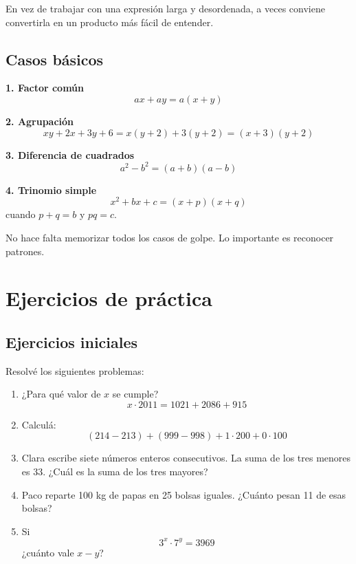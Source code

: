 \documentclass[12pt]{article}
\newcommand{\observa}[1]{%
    \begin{tcolorbox}[colback=amarilloSuave, colframe=naranjaEureka, title=Observa y piensa]
    #1
    \end{tcolorbox}
}
\begin{document}
        \begin{idea}
            En vez de trabajar con una expresión larga y desordenada, a veces conviene convertirla en un producto más fácil de entender.
        \end{idea}

        \subsection{Casos básicos}
            \textbf{1. Factor común}
            \[
            ax+ay=a(x+y)
            \]

            \textbf{2. Agrupación}
            \[
            xy+2x+3y+6=x(y+2)+3(y+2)=(x+3)(y+2)
            \]

            \textbf{3. Diferencia de cuadrados}
            \[
            a^2-b^2=(a+b)(a-b)
            \]

            \textbf{4. Trinomio simple}
            \[
            x^2+bx+c=(x+p)(x+q)
            \]
            cuando \(p+q=b\) y \(pq=c\).

            \observa{No hace falta memorizar todos los casos de golpe. Lo importante es reconocer patrones.}

    \newpage
    \section{Ejercicios de práctica}
        \subsection{Ejercicios iniciales}
            \begin{desafio}
                Resolvé los siguientes problemas:
                \begin{enumerate}
                    \item ¿Para qué valor de \(x\) se cumple?
                    \[
                    x\cdot 2011=1021+2086+915
                    \]

                    \item Calculá:
                    \[
                    (214-213)+(999-998)+1\cdot 200+0\cdot 100
                    \]

                    \item Clara escribe siete números enteros consecutivos.
                    La suma de los tres menores es 33.
                    ¿Cuál es la suma de los tres mayores?

                    \item Paco reparte 100 kg de papas en 25 bolsas iguales.
                    ¿Cuánto pesan 11 de esas bolsas?

                    \item Si
                    \[
                    3^x\cdot 7^y=3969
                    \]
                    ¿cuánto vale \(x-y\)?
                \end{enumerate}
            \end{desafio}
\end{document}
